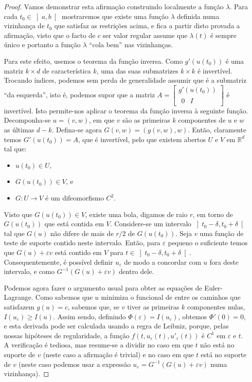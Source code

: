 \documentclass{article}
\theoremstyle{nonumberplain}
\newtheorem{proof}{Proof}
\newcommand{\R}{\mathbb{R}}
\begin{document}
\begin{proof}
Vamos demonstrar esta afirmação construindo localmente a função $\lambda$. Para cada $t_0 \in \left]a,b\right[$ mostraremos que existe uma função $\lambda$ definida numa vizinhança de $t_0$ que satisfaz as restrições acima, e fica a partir disto provada a afirmação, visto que o facto de $c$ ser valor regular assume que $\lambda(t)$ é sempre único e portanto a função $\lambda$ ``cola bem'' nas vizinhanças.

Para este efeito, usemos o teorema da função inversa. Como $g'(u(t_0))$ é uma matriz $k \times d$ de característica $k$, uma das suas submatrizes $k \times k$ é invertível. Trocando índices, podemos sem perda de generalidade assumir que é a submatriz ``da esquerda'', isto é, podemos supor que a matriz
$
A = \begin{bmatrix}
g'(u(t_0))\\
\begin{matrix}
0 & I
\end{matrix}
\end{bmatrix}
$
é invertível. Isto permite-nos aplicar o teorema da função inversa à seguinte função. Decomponha-se $u = (v, w)$, em que $v$ são as primeiras $k$ componentes de $u$ e $w$ as últimas $d-k$. Defina-se agora $G(v,w) = (g(v,w),w)$. Então, claramente temos $G'(u(t_0)) = A$, que é invertível, pelo que existem abertos $U$ e $V$ em $\R^d$ tal que:
\begin{itemize}
\item $u(t_0) \in U$,
\item $G(u(t_0)) \in V$, e
\item $G \colon U \to V$ é um difeomorfismo $C^2$.
\end{itemize}

Visto que $G(u(t_0)) \in V$, existe uma bola, digamos de raio $r$, em torno de $G(u(t_0))$ que está contida em $V$. Considere-se um intervalo $\left]t_0-\delta, t_0 + \delta\right[$ tal que $G(u)$ não difere de mais de $r/2$ de $G(u(t_0))$. Seja $v$ uma função de teste de suporte contido neste intervalo. Então, para $\varepsilon$ pequeno o suficiente temos que $G(u) + \varepsilon v$ está contido em $V$ para $t \in \left]t_0-\delta,t_0+\delta\right[$. Consequentemente, é possível definir $u_\varepsilon$ de modo a concordar com $u$ fora deste intervalo, e como $G^{-1}(G(u) + \varepsilon v)$ dentro dele.

Podemos agora fazer o argumento usual para obter as equações de Euler-Lagrange. Como sabemos que $u$ minimiza o funcional de entre os caminhos que satisfazem $g(u) = c$, sabemos que, se $v$ tiver as primeiras $k$ componentes nulas, $I(u_\varepsilon) \geq I(u)$. Assim sendo, definindo $\Phi(\varepsilon) = I(u_\varepsilon)$, obtemos $\Phi'(0) = 0$, e esta derivada pode ser calculada usando a regra de Leibniz, porque, pelas nossas hipóteses de regularidade, a função $f(t, u_\varepsilon(t), u'_\varepsilon(t))$ é $C^1$ em $\varepsilon$ e $t$. A verificação é tediosa, mas resume-se a dividir no caso em que $t$ não está no suporte de $v$ (neste caso a afirmação é trivial) e no caso em que $t$ está no suporte de $v$ (neste caso podemos usar a expressão $u_\varepsilon = G^{-1}(G(u) + \varepsilon v)$ numa vizinhança).


\end{proof}
\end{document}
